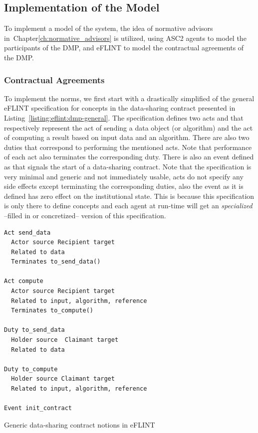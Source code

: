 \subsection{Implementation of the Model}
To implement a model of the system, the idea of normative advisors in~Chapter\ref{ch:normative_advisors} is utilized, using ASC2 agents to model the participants of the DMP, and eFLINT to model the contractual agreements of the DMP. 

\subsubsection{Contractual Agreements}
To implement the norms, we first start with a drastically simplified of the general eFLINT specification for concepts in the data-sharing contract presented in Listing~\ref{listing:eflint:dmp-general}. The specification defines two acts  and  that respectively represent the act of sending a data object (or algorithm) and the act of computing a result based on input data and an algorithm. There are also two duties that correspond to performing the mentioned acts. Note that performance of each act also terminates the corresponding duty. There is also an event defined as  that signals the start of a data-sharing contract. Note that the specification is very minimal and generic and not immediately usable, acts do not specify any side effects except terminating the corresponding duties, also the  event as it is defined has zero effect on the institutional state. This is because this specification is only there to define concepts and each agent at run-time will get an \textit{specialized} --filled in or concretized-- version of this specification.

\begin{listing}[t]
\centering
\begin{tcolorbox}[left=2pt,right=2pt,top=2pt,bottom=2pt,arc=0pt,
                  boxrule=0pt,toprule=1pt,
                  colback=white]
\begin{verbatim}
Act send_data
  Actor source Recipient target
  Related to data 
  Terminates to_send_data()

Act compute
  Actor source Recipient target
  Related to input, algorithm, reference
  Terminates to_compute()

Duty to_send_data
  Holder source  Claimant target 
  Related to data

Duty to_compute
  Holder source Claimant target
  Related to input, algorithm, reference

Event init_contract
\end{verbatim}
\end{tcolorbox}
\caption{Generic data-sharing contract notions in eFLINT}
\label{listing:eflint:dmp-general}
\end{listing}

